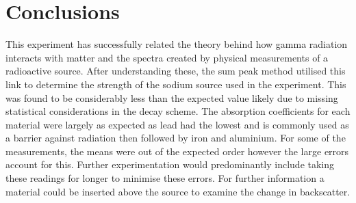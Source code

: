 \documentclass[11pt]{article} %
\begin{document}
\section{Conclusions}
This experiment has successfully related the theory behind how gamma radiation interacts with matter and the spectra created by physical measurements of a radioactive source. After understanding these, the sum peak method utilised this link to determine the strength of the sodium source used in the experiment. This was found to be considerably less than the expected value likely due to missing statistical considerations in the decay scheme. The absorption coefficients for each material were largely as expected as lead had the lowest and is commonly used as a barrier against radiation then followed by iron and aluminium. For some of the measurements, the means were out of the expected order however the large errors account for this. Further experimentation would predominantly include taking these readings for longer to minimise these errors. For further information a material could be inserted above the source to examine the change in backscatter.

\end{document}

